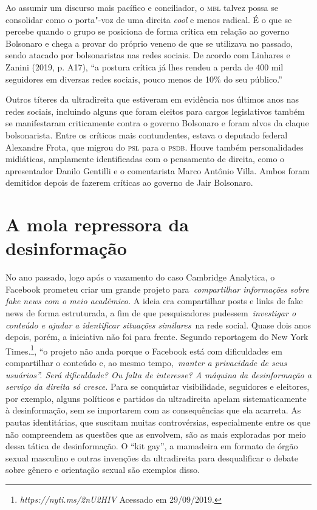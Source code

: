 Ao assumir um discurso mais pacífico e conciliador, o \textsc{mbl} talvez possa
se consolidar como o porta"-voz de uma direita \emph{cool} e menos
radical. É o que se percebe quando o grupo se posiciona de forma crítica
em relação ao governo Bolsonaro e chega a provar do próprio veneno de
que se utilizava no passado, sendo atacado por bolsonaristas nas redes
sociais. De acordo com Linhares e Zanini (2019, p. A17), ``a postura
crítica já lhes rendeu a perda de 400 mil seguidores em diversas redes
sociais, pouco menos de 10\% do seu público.''

Outros títeres da ultradireita que estiveram em evidência nos últimos
anos nas redes sociais, incluindo alguns que foram eleitos para cargos
legislativos também se manifestaram criticamente contra o governo
Bolsonaro e foram alvos da claque bolsonarista. Entre os críticos mais
contundentes, estava o deputado federal Alexandre Frota, que migrou do
\textsc{psl} para o \textsc{psdb}. Houve também personalidades midiáticas, amplamente
identificadas com o pensamento de direita, como o apresentador Danilo
Gentilli e o comentarista Marco Antônio Villa. Ambos foram demitidos
depois de fazerem críticas ao governo de Jair Bolsonaro.

\section{A mola repressora da desinformação}

\noindent{}No ano passado, logo após o vazamento do caso Cambridge Analytica, o
Facebook prometeu criar um grande projeto para~\emph{compartilhar
informações sobre fake news com o meio acadêmico.} A ideia era
compartilhar posts e links de fake news de forma estruturada, a fim de
que pesquisadores pudessem~\emph{investigar o conteúdo e ajudar a
identificar situações similares~}na rede social. Quase dois anos depois,
porém, a iniciativa não foi para frente. Segundo reportagem do New York
Times.\footnote{\emph{https://nyti.ms/2nU2HIV}
  Acessado em 29/09/2019.}, ``o projeto não anda porque o Facebook está
com dificuldades em compartilhar o conteúdo e, ao mesmo
tempo,~\emph{manter a privacidade de seus usuários''. Será
dificuldade? Ou falta de interesse? A máquina da desinformação a serviço
da direita só cresce.} Para se conquistar visibilidade, seguidores e
eleitores, por exemplo, alguns políticos e partidos da ultradireita
apelam sistematicamente à desinformação, sem se importarem com as
consequências que ela acarreta. As pautas identitárias, que suscitam
muitas controvérsias, especialmente entre os que não compreendem as
questões que as envolvem, são as mais exploradas por meio dessa tática
de desinformação. O ``kit gay'', a mamadeira em formato de órgão sexual
masculino e outras invenções da ultradireita para desqualificar o debate
sobre gênero e orientação sexual são exemplos disso.

